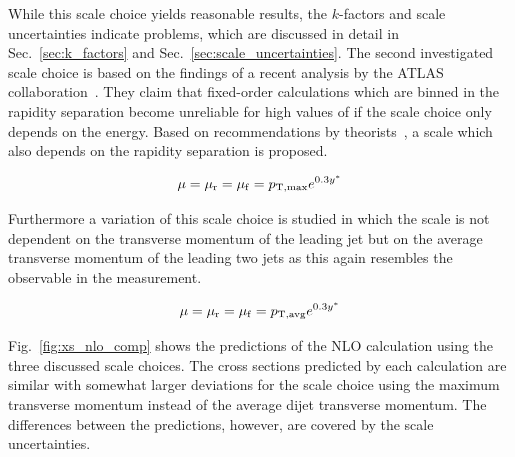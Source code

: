 While this scale choice yields reasonable results, the $k$-factors and scale
uncertainties indicate problems, which are discussed in detail in
Sec.~\ref{sec:k_factors} and Sec.~\ref{sec:scale_uncertainties}. The second
investigated scale choice is based on the findings of a recent analysis by the
ATLAS collaboration~\cite{Aad:2011fc}. They claim that fixed-order calculations
which are binned in the rapidity separation \ystar become  unreliable for high
values of \ystar if the scale choice only depends on the energy. Based on
recommendations by theorists~\cite{Ellis:1992en}, a scale which also depends on
the rapidity separation is proposed.

\begin{equation*}
    \mu = \mu_{\mathrm{r}} = \mu_{\mathrm{f}} = p_{\mathrm{T,max}} e^{0.3 y^*} 
\end{equation*}

Furthermore a variation of this scale choice is studied in which the scale is not
dependent on the transverse momentum of the leading jet but on the average
transverse momentum of the leading two jets as this again resembles the
observable in the measurement.

\begin{equation*}
    \mu = \mu_{\mathrm{r}} = \mu_{\mathrm{f}} = p_{\mathrm{T,avg}} e^{0.3 y^*} 
\end{equation*}

Fig.~\ref{fig:xs_nlo_comp} shows the predictions of the NLO calculation using
the three discussed scale choices. The cross sections predicted by each
calculation are similar with somewhat larger deviations for the scale choice using the
maximum transverse momentum instead of the average dijet transverse momentum.
The differences between the predictions, however, are covered by the scale
uncertainties.


